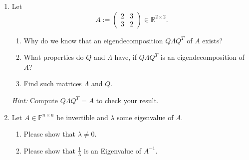 \begin{enumerate}
\item Let $$A:=\begin{pmatrix}2&3\\3&2 \end{pmatrix} \in \mathbb{R}^{2\times 2}. $$
\begin{enumerate}
	\item Why do we know that an eigendecomposition $Q \Lambda Q^T$ of $A$ exists?
	\item What properties do $Q$ and $\Lambda$ have, if $Q \Lambda Q^T$ is an eigendecomposition of $A$?
	\item Find such matrices $\Lambda$ and $Q$.
\end{enumerate}
\textit{Hint:} Compute $Q \Lambda Q^T = A$ to check your result.
\item Let $A \in \mathbb{F}^{n \times n}$ be invertible and $\lambda$ some eigenvalue of $A$.
\begin{enumerate}
	\item Please show that $\lambda \neq 0$.
	\item Please show that $\frac{1}{\lambda}$ is an Eigenvalue of $A^{-1}$.
\end{enumerate}
\end{enumerate}
 